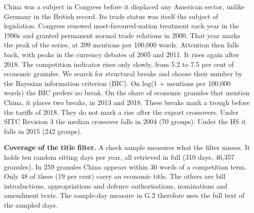 China was a subject in Congress before it displaced any American sector,
unlike Germany in the British record. Its trade status was itself the
subject of legislation. Congress renewed most-favoured-nation treatment
each year in the 1990s and granted permanent normal trade relations in
2000. That year marks the peak of the series, at 399 mentions per
100,000 words. Attention then falls back, with peaks in the currency
debates of 2005 and 2011. It rises again after 2018. The competition
indicator rises only slowly, from 5.2 to 7.5 per cent of economic
granules. We search for structural breaks and choose their number by the
Bayesian information criterion (BIC). On log(1 + mentions per 100,000
words) the BIC prefers no break. On the share of economic granules that
mention China, it places two breaks, in 2013 and 2018. These breaks mark
a trough before the tariffs of 2018. They do not mark a rise after the
export crossovers. Under SITC Revision 3 the median crossover falls in
2004 (70 groups). Under the HS it falls in 2015 (242 groups).

\textbf{Coverage of the title filter.} A check sample measures what the
filter misses. It holds ten random sitting days per year, all retrieved
in full (310 days, 46,357 granules). In 259 granules China appears
within 30 words of a competition term. Only 48 of these (19 per cent)
carry an economic title. The others are bill introductions,
appropriations and defence authorisations, nominations and amendment
texts. The sample-day measure in G.2 therefore uses the full text of the
sampled days.

